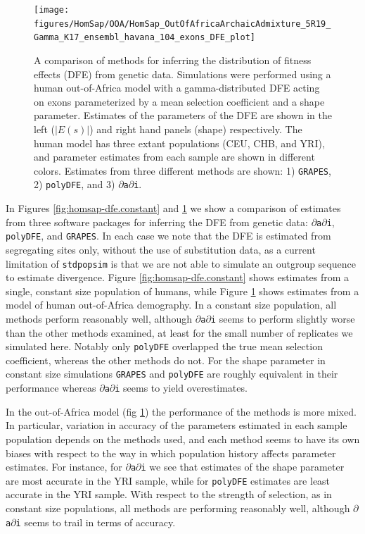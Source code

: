 \documentclass[hidelinks]{article}
\newcommand{\stdpopsim}{\texttt{stdpopsim}\xspace}
\newcommand{\polydfe}{\texttt{polyDFE}\xspace}
\newcommand{\dadi}{$\partial$\texttt{a}$\partial$\texttt{i}\xspace}
\newcommand{\grapes}{\texttt{GRAPES}\xspace}
\begin{document}
    \begin{figure}[htbp]
        \centering
        \texttt{[image: figures/HomSap/OOA/HomSap\_OutOfAfricaArchaicAdmixture\_5R19\_Gamma\_K17\_ensembl\_havana\_104\_exons\_DFE\_plot]}
        \caption{A comparison of methods for inferring the distribution of fitness effects (DFE) from genetic data.
        Simulations were performed using a human out-of-Africa model \citep{ragsdale2019models} with a gamma-distributed DFE
        acting on exons parameterized by a mean selection coefficient and a shape parameter. Estimates of the 
        parameters of the DFE are shown in the left ($\lvert E(s) \rvert $) and right hand panels (shape) respectively.
        The human model has three extant populations (CEU, CHB, and YRI), and parameter estimates from each
        sample are shown in different colors.
        Estimates from three different methods are shown: 1) \grapes \cite{galtier2016adaptive}, 2) \polydfe \citep{tataru2020polydfe},
        and 3) \dadi \citep{gutenkunst2009inferring}.}
        \label{fig:homsap-dfe.ooa}
    \end{figure}

    In Figures \ref{fig:homsap-dfe.constant} and \ref{fig:homsap-dfe.ooa} we show a comparison of estimates
    from three software packages for inferring the DFE from genetic data:
    \dadi \citep{gutenkunst2009inferring}, \polydfe \citep{tataru2020polydfe}, 
    and \grapes \citep{galtier2016adaptive}.
    In each case we note that the DFE is estimated from segregating sites only,
    without the use of substitution data, as a current limitation of \stdpopsim
    is that we are not able to simulate an outgroup sequence to estimate
    divergence. 
    Figure \ref{fig:homsap-dfe.constant} shows estimates from a single, constant size population of humans, 
    while Figure \ref{fig:homsap-dfe.ooa} shows estimates from a model of human out-of-Africa demography.
    In a constant size population, all methods perform reasonably well, although \dadi seems to
    perform slightly worse than the other methods examined, at least for the small number of replicates we simulated here.
    Notably only \polydfe overlapped the true mean selection coefficient, whereas 
    the other methods do not. 
    For the shape parameter in constant size simulations \grapes and \polydfe are roughly
    equivalent in their performance whereas \dadi seems to yield overestimates. 
    
    In the out-of-Africa model (fig \ref{fig:homsap-dfe.ooa}) the performance of the methods is more mixed. 
    In particular, variation in accuracy of the parameters estimated in each
    sample population depends on the methods used, and each method seems to 
    have its own biases with respect to the way in which population history 
    affects parameter estimates. For instance, for \dadi we see that estimates of 
    the shape parameter are most accurate in the YRI sample, while for \polydfe
    estimates are least accurate in the YRI sample. 
    With respect to the strength of selection, as in constant size populations,
    all methods are performing reasonably well, although \dadi seems to
    trail in terms of accuracy.
\end{document}
